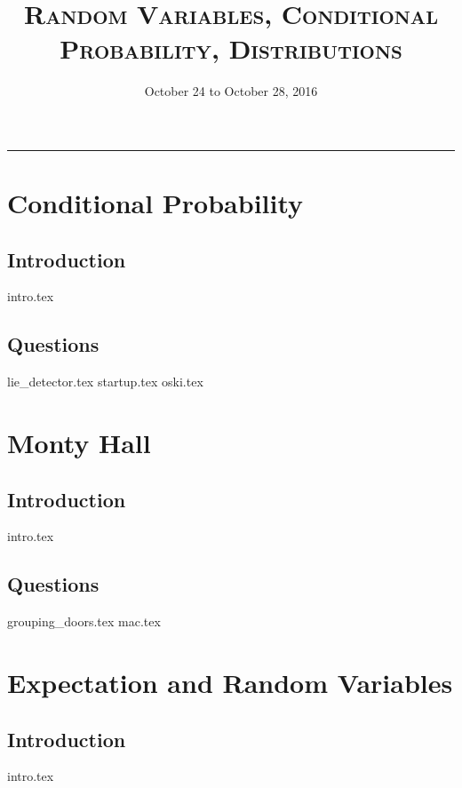 \documentclass{exam}
\title{\textsc{Random Variables, Conditional Probability, Distributions}}
\date{October 24 to October 28, 2016}
\begin{document}
\maketitle
\rule{\textwidth}{0.15em}
\fontsize{12}{15}\selectfont
\thispagestyle{empty}

\section{Conditional Probability}
\subsection{Introduction}
{intro.tex}
\subsection{Questions}
\begin{questions}
{lie_detector.tex}
{startup.tex}
{oski.tex}
\end{questions}

\section{Monty Hall}
\subsection{Introduction}
{intro.tex}
\subsection{Questions}
\begin{questions}
{grouping_doors.tex}
{mac.tex}
\end{questions}

\section{Expectation and Random Variables}
\subsection{Introduction}
{intro.tex}
\end{document}
